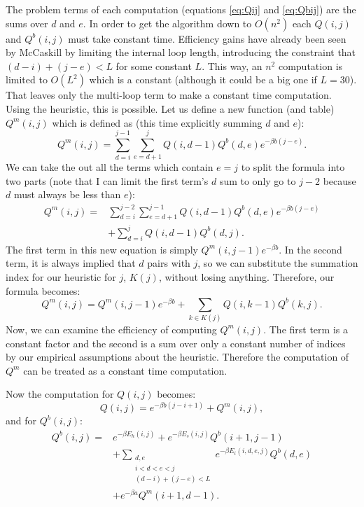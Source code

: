 The problem terms of each computation (equations \ref{eq:Qij} and
\ref{eq:Qbij}) are the sums over $d$ and $e$. In order to get the
algorithm down to $O(n^2)$ each $Q(i,j)$ and $Q^b(i,j)$ must take
constant time. Efficiency gains have already been seen by McCaskill by
limiting the internal loop length, introducing the constraint that
$(d-i) + (j-e) < L$ for some constant $L$. This way, an $n^2$
computation is limited to $O(L^2)$ which is a constant (although it
could be a big one if $L=30$). That leaves only the multi-loop term to
make a constant time computation. Using the heuristic, this is
possible. Let us define a new function (and table) $Q^m(i, j)$ which
is defined as (this time explicitly summing $d$ and $e$):
\begin{equation}
Q^m(i, j) = \sum_{d = i}^{j-1}\sum_{e = d+1}^{j} Q(i, d-1)Q^b(d,e)e^{-\beta b(j-e)}.
\end{equation}
We can take the out all the terms which contain $e = j$ to split the
formula into two parts (note that I can limit the first term's $d$ sum
to only go to $j-2$ because $d$ must always be less than $e$):
\begin{equation}
\begin{split}
Q^m(i, j) =& \sum_{d = i}^{j-2}\sum_{e = d+1}^{j-1} Q(i, d-1)Q^b(d,e)e^{-\beta b(j-e)} \\
&+ \sum_{d = i}^{j} Q(i, d-1)Q^b(d,j).
\end{split}
\end{equation}
The first term in this new equation is simply
$Q^m(i,j-1)e^{-\beta b}$. In the second term, it is always implied that
$d$ pairs with $j$, so we can substitute the summation index for our
heuristic for $j$, $K(j)$, without losing anything. Therefore, our
formula becomes:
\begin{equation}
Q^m(i, j) = Q^m(i, j -1) e^{-\beta b} + \sum_{k \in K(j)} Q(i, k - 1) Q^b(k, j).
\end{equation}
Now, we can examine the efficiency of computing $Q^m(i,j)$. The first
term is a constant factor and the second is a sum over only a constant
number of indices by our empirical assumptions about the
heuristic. Therefore the computation of $Q^m$ can be treated as a
constant time computation.

Now the computation for $Q(i,j)$ becomes:
\begin{equation}
Q(i,j) = e^{-\beta b(j-i+1)} + Q^m(i, j),
\end{equation} 
and for $Q^b(i,j)$:
\begin{equation}
\begin{split}
 Q^b(i, j) =& e^{-\beta E_h(i,j)}+
e^{-\beta E_s(i, j)} Q^b(i+1, j-1) \\ 
& + \sum_{\substack{d,e \\ i < d< e< j\\ (d-i) + (j-e) < L}} e^{-\beta E_i(i, d, e, j)}Q^b(d,e) \\ 
& + e^{-\beta a}Q^m(i+1, d-1) .
\end{split}
\end{equation}

